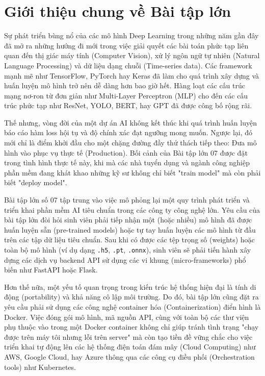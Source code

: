 \newpage
\section{Giới thiệu chung về Bài tập lớn}

Sự phát triển bùng nổ của các mô hình Deep Learning trong những năm gần đây đã mở ra những hướng đi mới trong việc giải quyết các bài toán phức tạp liên quan đến thị giác máy tính (Computer Vision), xử lý ngôn ngữ tự nhiên (Natural Language Processing) và dữ liệu dạng chuỗi (Time-series data). Các framework mạnh mẽ như TensorFlow, PyTorch hay Keras đã làm cho quá trình xây dựng và huấn luyện mô hình trở nên dễ dàng hơn bao giờ hết. Hàng loạt các cấu trúc mạng nơ-ron từ đơn giản như Multi-Layer Perceptron (MLP) cho đến các cấu trúc phức tạp như ResNet, YOLO, BERT, hay GPT đã được công bố rộng rãi.

Thế nhưng, vòng đời của một dự án AI không kết thúc khi quá trình huấn luyện báo cáo hàm loss hội tụ và độ chính xác đạt ngưỡng mong muốn. Ngược lại, đó mới chỉ là điểm khởi đầu cho một chặng đường đầy thử thách tiếp theo: Đưa mô hình vào phục vụ thực tế (Production). Bối cảnh của Bài tập lớn 07 được đặt trong tình hình thực tế này, khi mà các nhà tuyển dụng và ngành công nghiệp phần mềm đang khát khao những kỹ sư không chỉ biết "train model" mà còn phải biết "deploy model". 

Bài tập lớn số 07 tập trung vào việc mô phỏng lại một quy trình phát triển và triển khai phần mềm AI tiêu chuẩn trong các công ty công nghệ lớn. Yêu cầu của bài tập lớn đòi hỏi sinh viên phải tiếp nhận một (hoặc nhiều) mô hình đã được huấn luyện sẵn (pre-trained models) hoặc tự tay huấn luyện các mô hình từ đầu trên các tập dữ liệu tiêu chuẩn. Sau khi có được các tệp trọng số (weights) hoặc toàn bộ mô hình (ví dụ dạng \texttt{.h5}, \texttt{.pt}, \texttt{.onnx}), sinh viên sẽ phải tiến hành xây dựng các dịch vụ backend API sử dụng các vi khung (micro-frameworks) phổ biến như FastAPI hoặc Flask. 

Hơn thế nữa, một yếu tố quan trọng trong kiến trúc hệ thống hiện đại là tính di động (portability) và khả năng cô lập môi trường. Do đó, bài tập lớn cũng đặt ra yêu cầu phải sử dụng các công nghệ container hóa (Containerization) điển hình là Docker. Việc đóng gói mô hình, mã nguồn API, cùng với toàn bộ các thư viện phụ thuộc vào trong một Docker container không chỉ giúp tránh tình trạng "chạy được trên máy tôi nhưng lỗi trên server" mà còn tạo tiền đề vững chắc cho việc triển khai tự động lên các hệ thống điện toán đám mây (Cloud Computing) như AWS, Google Cloud, hay Azure thông qua các công cụ điều phối (Orchestration tools) như Kubernetes.

